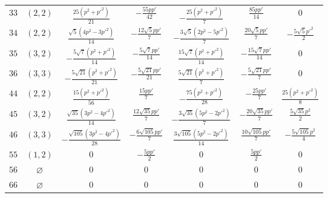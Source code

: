 \begin{table}[t]
\begin{tabular}{cc|ccccc}
$33$ & $(2,2)$ & $\frac{25 (p^{2} + p'^{2})}{21}$ & $- \frac{55 p p'}{42}$ & $- \frac{25 (p^{2} + p'^{2})}{7}$ & $\frac{85 p p'}{14}$ & $0$ \\
$34$ & $(2,2)$ & $\frac{\sqrt{5} (4 p^{2} - 3 p'^{2})}{14}$ & $- \frac{12 \sqrt{5} p p'}{7}$ & $- \frac{3 \sqrt{5} (2 p^{2} - 5 p'^{2})}{7}$ & $\frac{20 \sqrt{5} p p'}{7}$ & $- \frac{5 \sqrt{5} p'^{2}}{2}$ \\
$35$ & $(3,2)$ & $- \frac{5 \sqrt{7} (p^{2} + p'^{2})}{14}$ & $- \frac{5 \sqrt{7} p p'}{14}$ & $\frac{15 \sqrt{7} (p^{2} + p'^{2})}{14}$ & $- \frac{15 \sqrt{7} p p'}{14}$ & $0$ \\
$36$ & $(3,3)$ & $- \frac{5 \sqrt{21} (p^{2} + p'^{2})}{21}$ & $- \frac{5 \sqrt{21} p p'}{21}$ & $\frac{5 \sqrt{21} (p^{2} + p'^{2})}{7}$ & $- \frac{5 \sqrt{21} p p'}{7}$ & $0$ \\
$44$ & $(2,2)$ & $\frac{15 (p^{2} + p'^{2})}{56}$ & $\frac{15 p p'}{7}$ & $- \frac{75 (p^{2} + p'^{2})}{28}$ & $- \frac{25 p p'}{7}$ & $\frac{25 (p^{2} + p'^{2})}{8}$ \\
$45$ & $(3,2)$ & $\frac{\sqrt{35} (3 p^{2} - 4 p'^{2})}{14}$ & $\frac{12 \sqrt{35} p p'}{7}$ & $- \frac{3 \sqrt{35} (5 p^{2} - 2 p'^{2})}{7}$ & $- \frac{20 \sqrt{35} p p'}{7}$ & $\frac{5 \sqrt{35} p^{2}}{2}$ \\
$46$ & $(3,3)$ & $- \frac{\sqrt{105} (3 p^{2} - 4 p'^{2})}{28}$ & $- \frac{6 \sqrt{105} p p'}{7}$ & $\frac{3 \sqrt{105} (5 p^{2} - 2 p'^{2})}{14}$ & $\frac{10 \sqrt{105} p p'}{7}$ & $- \frac{5 \sqrt{105} p^{2}}{4}$ \\
$55$ & $(1,2)$ & $0$ & $- \frac{5 p p'}{2}$ & $0$ & $\frac{5 p p'}{2}$ & $0$ \\
$56$ & $\varnothing$ & $0$ & $0$ & $0$ & $0$ & $0$ \\
$66$ & $\varnothing$ & $0$ & $0$ & $0$ & $0$ & $0$ \\
\end{tabular}
\endgroup
\end{table}
